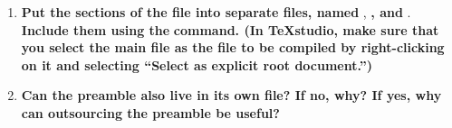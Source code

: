 \begin{enumerate}
  \item \textbf{Put the sections of the file into separate files, named} 
  , \textbf{, and} . 
  \textbf{Include them using the}  \textbf{command. (In TeXstudio, make sure that you select the main file as the file to be compiled by right-clicking on it and selecting \enquote{Select as explicit root document.})}
  \item \textbf{Can the preamble also live in its own file? If no, why? If yes, why can outsourcing the preamble be useful?}
\end{enumerate}

